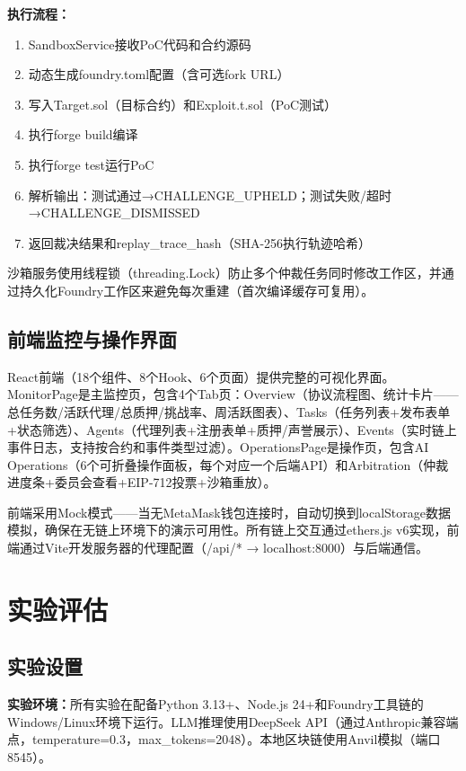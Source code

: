 \documentclass[10.5pt,compsoc]{CjC}
\begin{document}
\textbf{执行流程：}
\begin{enumerate}[nosep]
  \item SandboxService接收PoC代码和合约源码
  \item 动态生成foundry.toml配置（含可选fork URL）
  \item 写入Target.sol（目标合约）和Exploit.t.sol（PoC测试）
  \item 执行forge build编译
  \item 执行forge test运行PoC
  \item 解析输出：测试通过→CHALLENGE\_UPHELD；测试失败/超时→CHALLENGE\_DISMISSED
  \item 返回裁决结果和replay\_trace\_hash（SHA-256执行轨迹哈希）
\end{enumerate}

沙箱服务使用线程锁（threading.Lock）防止多个仲裁任务同时修改工作区，并通过持久化Foundry工作区来避免每次重建（首次编译缓存可复用）。

\subsection{前端监控与操作界面}

React前端（18个组件、8个Hook、6个页面）提供完整的可视化界面。MonitorPage是主监控页，包含4个Tab页：Overview（协议流程图、统计卡片——总任务数/活跃代理/总质押/挑战率、周活跃图表）、Tasks（任务列表+发布表单+状态筛选）、Agents（代理列表+注册表单+质押/声誉展示）、Events（实时链上事件日志，支持按合约和事件类型过滤）。OperationsPage是操作页，包含AI Operations（6个可折叠操作面板，每个对应一个后端API）和Arbitration（仲裁进度条+委员会查看+EIP-712投票+沙箱重放）。

前端采用Mock模式——当无MetaMask钱包连接时，自动切换到localStorage数据模拟，确保在无链上环境下的演示可用性。所有链上交互通过ethers.js v6实现，前端通过Vite开发服务器的代理配置（/api/* → localhost:8000）与后端通信。

\section{实验评估}

\subsection{实验设置}

\textbf{实验环境：}所有实验在配备Python 3.13+、Node.js 24+和Foundry工具链的Windows/Linux环境下运行。LLM推理使用DeepSeek API（通过Anthropic兼容端点，temperature=0.3，max\_tokens=2048）。本地区块链使用Anvil模拟（端口8545）。
\end{document}
